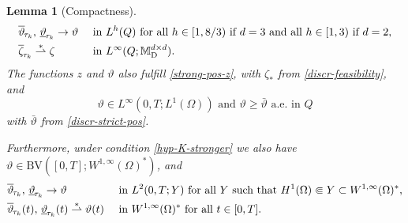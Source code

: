 \documentclass[a4paper,10pt,reqno]{amsart}
\numberwithin{equation}{section}
\newcommand{\bbM}{\mathbb{M}}
\numberwithin{equation}{section}
\newtheorem{lemma}[theorem]{Lemma}
\newcommand{\weakto}{\rightharpoonup} %
\newcommand{\weaksto}{\overset{*}{\rightharpoonup}}
\newcommand{\teta}{\vartheta}
\newcommand{\piecewiseConstant}[2]{\overline{#1}_{\kern-1pt#2}}
\newcommand{\pwc}{\piecewiseConstant}
\newcommand{\upiecewiseConstant}[2]{\underline{#1}_{\kern-1pt#2}}
\newcommand{\upwc}{\upiecewiseConstant}
\newcommand{\BV}{\mathrm{BV}}
\newcommand{\mt}{\bbM}
\newcommand{\dev}{\mathrm{D}}
\begin{document}
\begin{lemma}[Compactness]
\begin{subequations}
\begin{align}
&
\label{cvT5}
\pwc\teta{\tau_k},\,  \upwc\teta{\tau_k}\to \teta &&  \text{  in $L^h(Q)$
for all $h\in [1,8/3) $ if $d=3$ and all $h\in [1, 3)$ if $d=2$,}
\\
& 
\label{cvZ}
\pwc\zeta{\tau_k} \weaksto \zeta && \text{ in $L^\infty (Q;\mt_\dev^{d \times d})$}.
\end{align}
\end{subequations}
The functions $z$ and   $\teta$  also fulfill \eqref{strong-pos-z}, with $\zeta_*$ from \eqref{discr-feasibility}, and 
\begin{equation}
\label{additional-teta}
\teta \in L^\infty (0,T; L^1(\Omega)) \text{ and }
 \teta \geq \bar{\teta} \text{ a.e.\ in $Q$}
 \end{equation}
  with $\bar{\teta}$  from \eqref{discr-strict-pos}.
\par
Furthermore, under condition \eqref{hyp-K-stronger} we also have $\teta \in \mathrm{BV} ([0,T]; W^{1,\infty} (\Omega)^*)$, and
\begin{subequations}
\begin{align}
& \label{cvT6}
\pwc\teta{\tau_k} ,\, \upwc\teta{\tau_k}  \to \teta && \text{ in } L^2 (0,T; Y) \text{ for all $Y$ such that $H^1(\Omega) \Subset Y \subset W^{1,\infty} (\Omega)^*$},
\\
&
\label{cvT7}
\pwc\teta{\tau_k}(t),\,  \upwc\teta{\tau_k}(t) \weaksto \teta(t) && \text{ in } W^{1,\infty} (\Omega)^* \text{ for all } t \in [0,T].
\end{align}
\end{subequations}
\end{lemma}
\noindent
\end{document}
